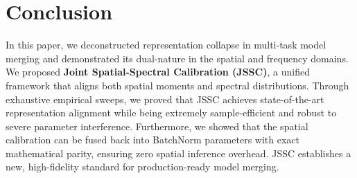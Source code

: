 \documentclass{article}
\begin{document}
\section{Conclusion}
\label{sec:conclusion}
In this paper, we deconstructed representation collapse in multi-task model merging and demonstrated its dual-nature in the spatial and frequency domains. We proposed \textbf{Joint Spatial-Spectral Calibration (JSSC)}, a unified framework that aligns both spatial moments and spectral distributions. Through exhaustive empirical sweeps, we proved that JSSC achieves state-of-the-art representation alignment while being extremely sample-efficient and robust to severe parameter interference. Furthermore, we showed that the spatial calibration can be fused back into BatchNorm parameters with exact mathematical parity, ensuring zero spatial inference overhead. JSSC establishes a new, high-fidelity standard for production-ready model merging.



\end{document}
